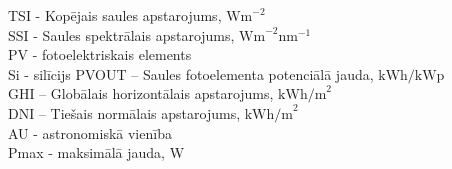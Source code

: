 \noindent TSI - Kopējais saules apstarojums, $\textrm{Wm}^{-2}$\\
SSI - Saules spektrālais apstarojums, $\textrm{Wm}^{-2}\textrm{nm}^{-1}$\\
PV - fotoelektriskais elements\\ %
Si - silīcijs
PVOUT – Saules fotoelementa potenciālā jauda, $\textrm{kWh/kWp}$\\ %
GHI – Globālais horizontālais apstarojums,  $\textrm{kWh/m}^2$\\ %
DNI – Tiešais normālais apstarojums, $\textrm{kWh/m}^2$\\ %
AU - astronomiskā vienība\\  %
Pmax - maksimālā jauda, W

